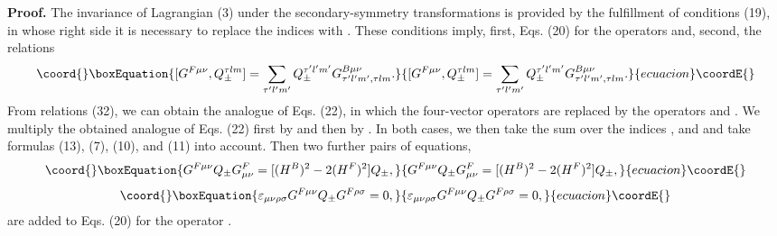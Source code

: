 \documentclass[a4paper,12pt]{article}
\begin{document}
{\bf Proof.} The invariance of Lagrangian (3) under the secondary-symmetry
transformations is provided by the fulfillment of conditions (19), in whose
right side it is necessary to replace the indices \myHighlight{$\pm$}\coordHE{} with \myHighlight{$\mp$}\coordHE{}. These
conditions imply, first, Eqs. (20) for the operators \coordHE{} and, second, the
relations
\begin{equation}\coord{}\boxEquation{
[G^{F \mu\nu}, Q^{\tau lm}_{\pm}] =
\sum_{\tau' l'm'} Q^{\tau' l'm'}_{\pm} 
G^{B \mu\nu}_{\tau' l'm', \tau lm}.
}{
[G^{F \mu\nu}, Q^{\tau lm}_{\pm}] =
\sum_{\tau' l'm'} Q^{\tau' l'm'}_{\pm} 
G^{B \mu\nu}_{\tau' l'm', \tau lm}.
}{ecuacion}\coordE{}\end{equation}
From relations (32), we can obtain the analogue of Eqs. (22), in which the
four-vector operators are replaced by the operators \coordHE{} and 
\coordHE{}. We multiply the obtained analogue of Eqs. (22) first by 
\coordHE{} and then by \myHighlight{$\varepsilon_{\mu\nu\rho\sigma}$}\coordHE{}. In
both cases, we then take the sum over the indices \myHighlight{$\mu, \nu, \rho$}\coordHE{}, and 
\myHighlight{$\sigma$}\coordHE{} and take formulas (13), (7), (10), and (11) into account. Then two
further pairs of equations,
\begin{equation}\coord{}\boxEquation{
G^{F \mu\nu}Q_{\pm}G^{F}_{\mu\nu}=[(H^{B})^{2}-2(H^{F})^{2}]Q_{\pm},
}{
G^{F \mu\nu}Q_{\pm}G^{F}_{\mu\nu}=[(H^{B})^{2}-2(H^{F})^{2}]Q_{\pm},
}{ecuacion}\coordE{}\end{equation}
\begin{equation}\coord{}\boxEquation{
\varepsilon_{\mu\nu\rho\sigma}G^{F \mu\nu}Q_{\pm}G^{F\rho\sigma}=0,
}{
\varepsilon_{\mu\nu\rho\sigma}G^{F \mu\nu}Q_{\pm}G^{F\rho\sigma}=0,
}{ecuacion}\coordE{}\end{equation}
are added to Eqs. (20) for the operator \coordHE{}.
\end{document}
